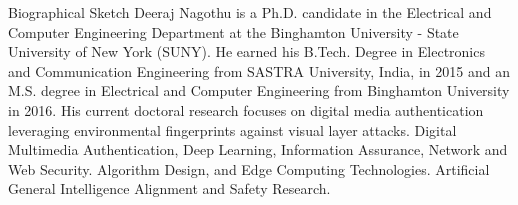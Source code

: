 \begin{rubric}{Biographical Sketch}
    \entry*[]
    Deeraj Nagothu is a Ph.D. candidate in the Electrical and Computer Engineering Department at the Binghamton University - State University of New York (SUNY). He earned his B.Tech. Degree in Electronics and Communication Engineering from SASTRA University, India, in 2015 and an M.S. degree in Electrical and Computer Engineering from Binghamton University in 2016. His current doctoral research focuses on digital media authentication leveraging environmental fingerprints against visual layer attacks.
    \entry*[]
    Digital Multimedia Authentication, Deep Learning, Information Assurance, Network and Web Security.
    \entry*[]
    Algorithm Design, and Edge Computing Technologies. 
    \entry*[]
    Artificial General Intelligence Alignment and Safety Research.
\end{rubric}